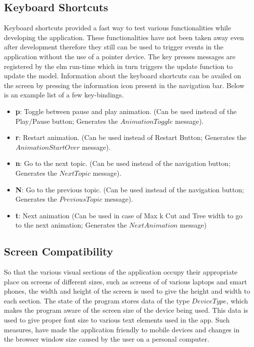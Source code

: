 \subsection{Keyboard Shortcuts}
Keyboard shortcuts provided a fast way to test various functionalities while
developing the application.  These functionalities have not been taken away
even after development therefore they still can be used to trigger events in
the application without the use of a pointer device. 
The key presses messages are registered by the elm run-time which in turn
triggers the update function to update the model. Information about the keyboard shortcuts can be
availed on the screen by pressing the information icon present in the
navigation bar. Below is an example list of a few key-bindings.

\begin{itemize}
\item \textbf{p}: Toggle between pause and play animation. (Can be used instead of the Play/Pause button; Generates the $AnimationToggle$ message). \\
\item \textbf{r}: Restart animation. (Can be used instead of Restart Button; Generates the $AnimationStartOver$ message). \\
\item \textbf{n}: Go to the next topic. (Can be used instead of the navigation button; Generates the $NextTopic$ message). \\
\item \textbf{N}: Go to the previous topic. (Can be used instead of the navigation button; Generates the $PreviousTopic$ message). \\
\item \textbf{t}: Next animation (Can be used in case of Max k Cut and Tree width to go to the next animation; Generates the $NextAnimation$ message)
\end{itemize}


\subsection{Screen Compatibility}
So that the various visual sections of the application occupy their appropriate
place on screens of different sizes, such as screens of of various laptops and
smart phones, the width and height of the screen is used to give the height and
width to each section.  
The state of the program stores data of the type $DeviceType$, which makes the
program aware of the screen size of the device being used. This data is used to
give proper font size to various text elements used in the app. Such measures,
have made the application friendly to mobile devices and changes in the browser
window size caused by the user on a personal computer.

